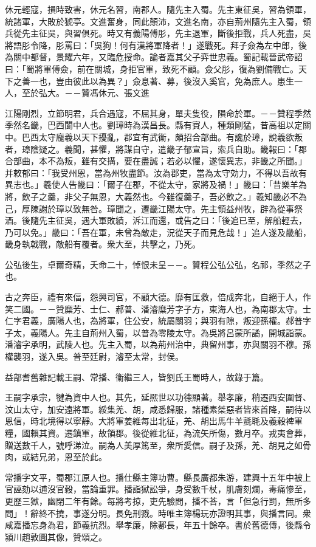 \begin{pinyinscope}
休元輕寇，損時致害，休元名習，南郡人。隨先主入蜀。先主東征吳，習為領軍，統諸軍，大敗於猇亭。文進奮身，同此顛沛，文進名南，亦自荊州隨先主入蜀，領兵從先主征吳，與習俱死。時又有義陽傅肜，先主退軍，斷後拒戰，兵人死盡，吳將語肜令降，肜罵曰：「吳狗！何有漢將軍降者！」遂戰死。拜子僉為左中郎，後為關中都督，景耀六年，又臨危授命。論者嘉其父子弈世忠義。蜀記載晉武帝詔曰：「蜀將軍傅僉，前在關城，身拒官軍，致死不顧。僉父肜，復為劉備戰亡。天下之善一也，豈由彼此以為異？」僉息著、募，後沒入奚官，免為庶人。患生一人，至於弘大。－－贊馮休元、張文進

江陽剛烈，立節明君，兵合遇寇，不屈其身，單夫隻役，隕命於軍。－－贊程季然季然名畿，巴西閬中人也。劉璋時為漢昌長。縣有賨人，種類剛猛，昔高祖以定關中。巴西太守龐羲以天下擾亂，郡宜有武衞，頗招合部曲。有讒於璋，說羲欲叛者，璋陰疑之。羲聞，甚懼，將謀自守，遣畿子郁宣旨，索兵自助。畿報曰：「郡合部曲，本不為叛，雖有交搆，要在盡誠；若必以懼，遂懷異志，非畿之所聞。」并敕郁曰：「我受州恩，當為州牧盡節。汝為郡吏，當為太守効力，不得以吾故有異志也。」羲使人告畿曰：「爾子在郡，不從太守，家將及禍！」畿曰：「昔樂羊為將，飲子之羹，非父子無恩，大義然也。今雖復羹子，吾必飲之。」羲知畿必不為己，厚陳謝於璋以致無咎。璋聞之，遷畿江陽太守。先主領益州牧，辟為從事祭酒。後隨先主征吳，遇大軍敗績，泝江而還，或告之曰：「後追已至，解船輕去，乃可以免。」畿曰：「吾在軍，未曾為敵走，況從天子而見危哉！」追人遂及畿船，畿身執戟戰，敵船有覆者。衆大至，共擊之，乃死。

公弘後生，卓爾奇精，夭命二十，悼恨未呈－－。贊程公弘公弘，名祁，季然之子也。

古之奔臣，禮有來偪，怨興司官，不顧大德。靡有匡救，倍成奔北，自絕于人，作笑二國。－－贊糜芳、士仁、郝普、潘濬糜芳字子方，東海人也，為南郡太守。士仁字君義，廣陽人也，為將軍，住公安，統屬關羽；與羽有隙，叛迎孫權。郝普字子太，義陽人。先主自荊州入蜀，以普為零陵太守。為吳將呂蒙所譎，開城詣蒙。潘濬字承明，武陵人也。先主入蜀，以為荊州治中，典留州事，亦與關羽不穆。孫權襲羽，遂入吳。普至廷尉，濬至太常，封侯。

益部耆舊雜記載王嗣、常播、衞繼三人，皆劉氏王蜀時人，故錄于篇。

王嗣字承宗，犍為資中人也。其先，延熈世以功德顯著。舉孝廉，稍遷西安圍督、汶山太守，加安遠將軍。綏集羌、胡，咸悉歸服，諸種素桀惡者皆來首降，嗣待以恩信，時北境得以寧靜。大將軍姜維每出北征，羌、胡出馬牛羊氈毦及義穀裨軍糧，國賴其資。遷鎮軍，故領郡。後從維北征，為流矢所傷，數月卒。戎夷會葬，贈送數千人，號呼涕泣。嗣為人美厚篤至，衆所愛信。嗣子及孫，羌、胡見之如骨肉，或結兄弟，恩至於此。

常播字文平，蜀郡江原人也。播仕縣主簿功曹。縣長廣都朱游，建興十五年中被上官誣劾以逋沒官穀，當論重罪。播詣獄訟爭，身受數千杖，肌膚刻爛，毒痛慘至，更歷三獄，幽閉二年有餘。每將考掠，吏先驗問，播不荅，言「但急行罰，無所多問」！辭終不撓，事遂分明。長免刑戮。時唯主簿楊玩亦證明其事，與播言同。衆咸嘉播忘身為君，節義抗烈。舉孝廉，除郪長，年五十餘卒。書於舊德傳，後縣令潁川趙敦圖其像，贊頌之。


\end{pinyinscope}
